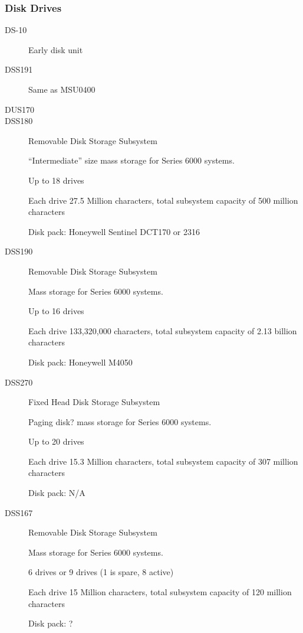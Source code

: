 \documentclass[notitlepage]{report}
\begin{document}
\subsubsection{Disk Drives}

    \begin{description}

        \item[DS-10] Early disk unit

        \item[DSS191] Same as MSU0400

        \item[DUS170] 

        \item[DSS180] Removable Disk Storage Subsystem 

“Intermediate” size mass storage for Series 6000 systems. 

Up to 18 drives

Each drive 27.5 Million characters, total subsystem capacity of 500 million 
characters

Disk pack: Honeywell Sentinel DCT170 or 2316

        \item[DSS190] Removable Disk Storage Subsystem 

Mass storage for Series 6000 systems.

Up to 16 drives

Each drive 133,320,000 characters, total subsystem capacity of 2.13 billion 
characters

Disk pack: Honeywell M4050

        \item[DSS270] Fixed Head  Disk Storage Subsystem 

Paging disk?  mass storage for Series 6000 systems.

Up to 20 drives

Each drive 15.3 Million characters, total subsystem capacity of 307 million 
characters

Disk pack: N/A

        \item[DSS167] Removable Disk Storage Subsystem 

Mass storage for Series 6000 systems.

6 drives or  9 drives (1 is spare, 8 active)

Each drive 15 Million characters, total subsystem capacity of 120 million 
characters

Disk pack:  ?


\end{description}
\end{document}

